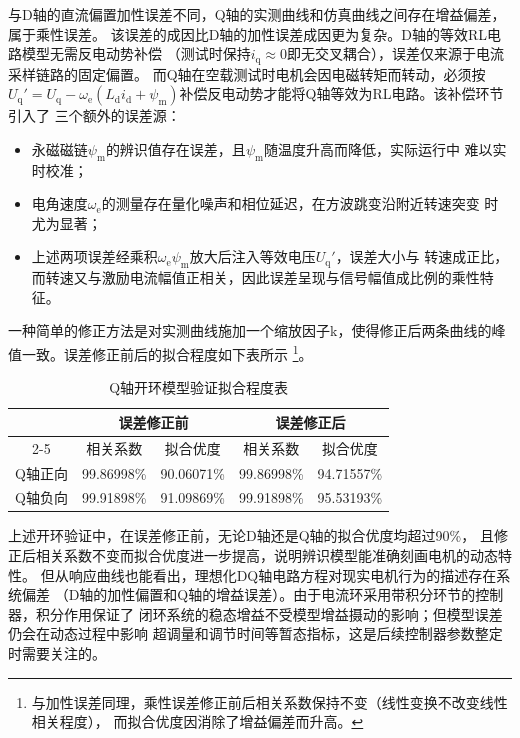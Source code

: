 与D轴的直流偏置加性误差不同，Q轴的实测曲线和仿真曲线之间存在增益偏差，属于乘性误差。
该误差的成因比D轴的加性误差成因更为复杂。D轴的等效RL电路模型无需反电动势补偿
（测试时保持\(i_{\mathrm{q}}\approx 0\)即无交叉耦合），误差仅来源于电流采样链路的固定偏置。
而Q轴在空载测试时电机会因电磁转矩而转动，必须按
\(U_{\mathrm{q}}'=U_{\mathrm{q}}-\omega_{\mathrm{e}}(L_{\mathrm{d}} i_{\mathrm{d}}+\psi_{\mathrm{m}})\)补偿反电动势才能将Q轴等效为RL电路。该补偿环节引入了
三个额外的误差源：
\begin{itemize}
    \item 永磁磁链\(\psi_{\mathrm{m}}\)的辨识值存在误差，且\(\psi_{\mathrm{m}}\)随温度升高而降低，实际运行中
    难以实时校准；
    \item 电角速度\(\omega_{\mathrm{e}}\)的测量存在量化噪声和相位延迟，在方波跳变沿附近转速突变
    时尤为显著；
    \item 上述两项误差经乘积\(\omega_{\mathrm{e}}\psi_{\mathrm{m}}\)放大后注入等效电压\(U_{\mathrm{q}}'\)，误差大小与
    转速成正比，而转速又与激励电流幅值正相关，因此误差呈现与信号幅值成比例的乘性特征。
\end{itemize}
一种简单的修正方法是对实测曲线施加一个缩放因子k，使得修正后两条曲线的峰值一致。误差修正前后的拟合程度如下表所示
\footnote{与加性误差同理，乘性误差修正前后相关系数保持不变（线性变换不改变线性相关程度），
而拟合优度因消除了增益偏差而升高。}。

\begin{table}[H]
    \centering
    \begin{tabular}{|c|c|c|c|c|}
        \hline
        \multirow{2}{*}{} & \multicolumn{2}{c|}{误差修正前} & \multicolumn{2}{c|}{误差修正后} \\
        \cline{2-5}
        & 相关系数 & 拟合优度 & 相关系数 & 拟合优度 \\
        \hline
        Q轴正向 & 99.86998\% & 90.06071\% & 99.86998\% & 94.71557\% \\
        \hline
        Q轴负向 & 99.91898\% & 91.09869\% & 99.91898\% & 95.53193\% \\
        \hline
    \end{tabular}
    \caption{Q轴开环模型验证拟合程度表}
    \label{tab:Q轴开环模型验证拟合程度表}
\end{table}

上述开环验证中，在误差修正前，无论D轴还是Q轴的拟合优度均超过90\%，
且修正后相关系数不变而拟合优度进一步提高，说明辨识模型能准确刻画电机的动态特性。
但从响应曲线也能看出，理想化DQ轴电路方程对现实电机行为的描述存在系统偏差
（D轴的加性偏置和Q轴的增益误差）。由于电流环采用带积分环节的控制器，积分作用保证了
闭环系统的稳态增益不受模型增益摄动的影响；但模型误差仍会在动态过程中影响
超调量和调节时间等暂态指标，这是后续控制器参数整定时需要关注的。